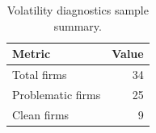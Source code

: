 \begin{table}[htbp]
\centering
\small
\caption{Volatility diagnostics sample summary.}
\label{tab:diag_summary}
\begin{tabular}{lr}
\toprule
Metric & Value \\
\midrule
Total firms & 34 \\
Problematic firms & 25 \\
Clean firms & 9 \\
\bottomrule
\end{tabular}
\end{table}
